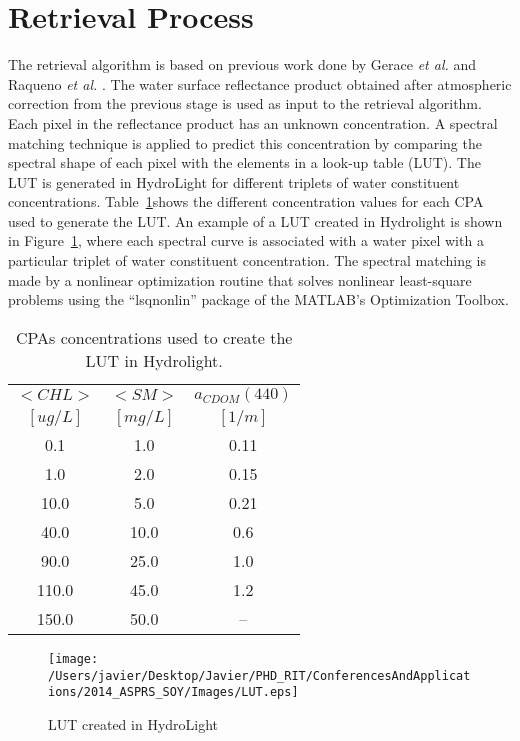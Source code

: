 \documentclass{article}
\begin{document}
\section{Retrieval Process}
The retrieval algorithm is based on previous work done by Gerace {\it et al.} \cite{Gerace:2013} and Raqueno {\it et al.} \cite{Raqueno:2000}. The water surface reflectance product obtained after atmospheric correction from the previous stage is used as input to the retrieval algorithm. Each pixel in the reflectance product has an unknown concentration. A spectral matching technique is applied to predict this concentration by comparing the spectral shape of each pixel with the elements in a look-up table (LUT). The LUT is generated in HydroLight for different triplets of water constituent concentrations. Table~\ref{tab:LUTconc}shows the different concentration values for each CPA used to generate the LUT. An example of a LUT created in Hydrolight is shown in Figure~\ref{fig:LUT}, where each spectral curve is associated with a water pixel with a particular triplet of water constituent concentration. The spectral matching is made by a nonlinear optimization routine that solves nonlinear least-square problems using the ``lsqnonlin'' package of the MATLAB's Optimization Toolbox. 
\begin{table}[!ht]
\caption{ CPAs concentrations used to create the LUT in Hydrolight. \label{tab:LUTconc} } 
\vspace{-.5cm}
\centering\small
\begin{tabular}{c|c|c}
            \bfseries{$<CHL>$}    & \bfseries{$<SM>$}  & \bfseries{$a_{CDOM}(440)$}\\
    $[ug/L]$      & $[mg/L]$ &  $[1/m]$\\ \hline \hline
0.1   & 1.0  &  0.11\\
1.0   & 2.0  &  0.15\\
10.0   & 5.0  &  0.21\\
40.0   & 10.0 &  0.6 \\
90.0  & 25.0 &  1.0 \\
110.0  & 45.0 &  1.2 \\
150.0  & 50.0 &  --  \\     
    \end{tabular}
\end{table}
\begin{figure}[!h]
    \centering
      \texttt{[image: /Users/javier/Desktop/Javier/PHD\_RIT/ConferencesAndApplications/2014\_ASPRS\_SOY/Images/LUT.eps]}
      \caption{LUT created in HydroLight}
      \label{fig:LUT}
\end{figure}
\end{document}
